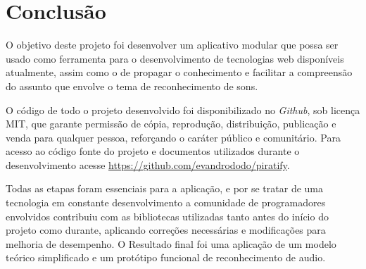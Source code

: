 \chapter{Conclusão}
\label{c.conclusao}

O objetivo deste projeto foi desenvolver um aplicativo modular que possa ser usado como ferramenta para o desenvolvimento de tecnologias web disponíveis atualmente, assim como o de propagar o conhecimento e facilitar a compreensão do assunto que envolve o tema de reconhecimento de sons. 

O código de todo o projeto desenvolvido foi disponibilizado no \emph{Github}, sob licença MIT, que garante permissão de cópia, reprodução, distribuição, publicação e venda para qualquer pessoa, reforçando o caráter público e comunitário. Para acesso ao código fonte do projeto e documentos utilizados durante o desenvolvimento acesse \url{https://github.com/evandrododo/piratify}.

Todas as etapas foram essenciais para a aplicação, e por se tratar de uma tecnologia em constante desenvolvimento a comunidade de programadores envolvidos contribuiu com as bibliotecas utilizadas tanto antes do início do projeto como durante, aplicando correções necessárias e modificações para melhoria de desempenho. O Resultado final foi uma aplicação de um modelo teórico simplificado e um protótipo funcional de reconhecimento de audio.